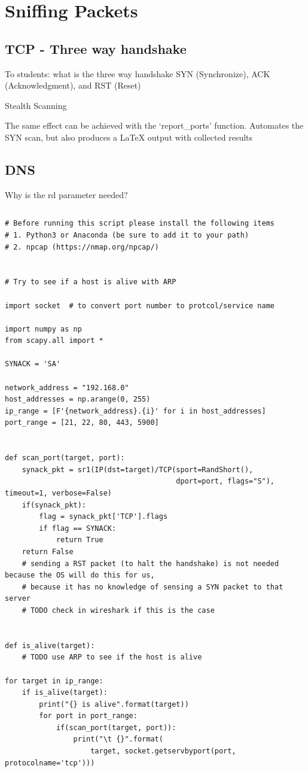 \documentclass[11pt,a4paper]{article}
\begin{document}
 \section{Sniffing Packets}

\subsection{TCP - Three way handshake}

To students: what is the three way handshake
SYN (Synchronize), ACK (Acknowledgment), and RST (Reset)

Stealth Scanning


The same effect can be achieved with the `report\_ports' function. Automates the SYN scan, but also produces a LaTeX output with collected results

\subsection{DNS}


Why is the rd parameter needed?

\inputminted[firstline=16]{python}{../code_students/dns_query.py}


\begin{verbatim}
# Before running this script please install the following items
# 1. Python3 or Anaconda (be sure to add it to your path)
# 2. npcap (https://nmap.org/npcap/)


# Try to see if a host is alive with ARP

import socket  # to convert port number to protcol/service name

import numpy as np
from scapy.all import *

SYNACK = 'SA'

network_address = "192.168.0"
host_addresses = np.arange(0, 255)
ip_range = [F'{network_address}.{i}' for i in host_addresses]
port_range = [21, 22, 80, 443, 5900]


def scan_port(target, port):
    synack_pkt = sr1(IP(dst=target)/TCP(sport=RandShort(),
                                        dport=port, flags="S"), timeout=1, verbose=False)
    if(synack_pkt):
        flag = synack_pkt['TCP'].flags
        if flag == SYNACK:
            return True
    return False
    # sending a RST packet (to halt the handshake) is not needed because the OS will do this for us,
    # because it has no knowledge of sensing a SYN packet to that server
    # TODO check in wireshark if this is the case


def is_alive(target):
    # TODO use ARP to see if the host is alive

for target in ip_range:
    if is_alive(target):
        print("{} is alive".format(target))
        for port in port_range:
            if(scan_port(target, port)):
                print("\t {}".format(
                    target, socket.getservbyport(port, protocolname='tcp')))
\end{verbatim}
\end{document}
